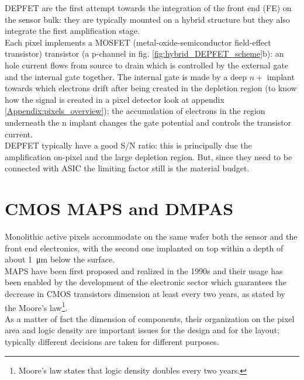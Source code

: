    DEPFET are the first attempt towards the integration of the front end (FE) on the sensor bulk: they are typically mounted on a hybrid structure but they also integrate the first amplification stage.\\
   Each pixel implements a MOSFET (metal-oxide-semiconductor field-effect transistor) transistor (a p-channel in fig. \ref{fig:hybrid_DEPFET_scheme}b): an hole current flows from source to drain which is controlled by the external gate and the internal gate together. The internal gate is made by a deep $n+$ implant towards which electrons drift after being created in the depletion region (to know how the signal is created in a pixel detector look at appendix \ref{Appendix:pixels_overview}); the accumulation of electrons in the region underneath the n implant changes the gate potential and controls the transistor current.\\
   DEPFET typically have a good S/N ratio: this is principally due the amplification on-pixel and the large depletion region. But, since they need to be connected with ASIC the limiting factor still is the material budget.

\section{CMOS MAPS and DMPAS}
   Monolithic active pixels accommodate on the same wafer both the sensor and the front end electronics, with the second one implanted on top within a depth of about \SI{1}{\um} below the surface. \\
   MAPS have been first proposed and realized in the 1990s and their usage has been enabled by the development of the electronic sector which guarantees the decrease in CMOS transistors dimension at least every two years, as stated by the Moore's law\footnote{Moore's law states that logic density doubles every two years.}.\\
   As a matter of fact the dimension of components, their organization on the pixel area and logic density are important issues for the design and for the layout; typically different decisions are taken for different purposes.

